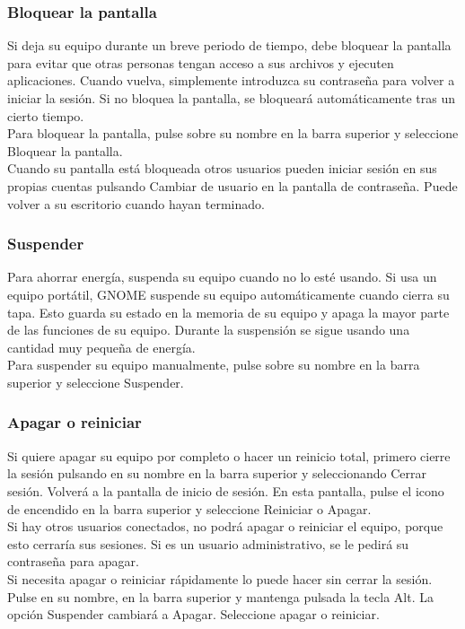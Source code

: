 \subsubsection{Bloquear la pantalla}
Si deja su equipo durante un breve periodo de tiempo, debe bloquear la pantalla para evitar que otras personas tengan acceso a sus archivos y ejecuten aplicaciones. Cuando vuelva, simplemente introduzca su contraseña para volver a iniciar la sesión. Si no bloquea la pantalla, se bloqueará automáticamente tras un cierto tiempo.\\

Para bloquear la pantalla, pulse sobre su nombre en la barra superior y seleccione Bloquear la pantalla.\\

Cuando su pantalla está bloqueada otros usuarios pueden iniciar sesión en sus propias cuentas pulsando Cambiar de usuario en la pantalla de contraseña. Puede volver a su escritorio cuando hayan terminado.
\subsubsection{Suspender}
Para ahorrar energía, suspenda su equipo cuando no lo esté usando. Si usa un equipo portátil, GNOME suspende su equipo automáticamente cuando cierra su tapa. Esto guarda su estado en la memoria de su equipo y apaga la mayor parte de las funciones de su equipo. Durante la suspensión se sigue usando una cantidad muy pequeña de energía.\\

Para suspender su equipo manualmente, pulse sobre su nombre en la barra superior y seleccione Suspender.
\subsubsection{Apagar o reiniciar}
Si quiere apagar su equipo por completo o hacer un reinicio total, primero cierre la sesión pulsando en su nombre en la barra superior y seleccionando Cerrar sesión. Volverá a la pantalla de inicio de sesión. En esta pantalla, pulse el icono de encendido en la barra superior y seleccione Reiniciar o Apagar.\\
Si hay otros usuarios conectados, no podrá apagar o reiniciar el equipo, porque esto cerraría sus sesiones. Si es un usuario administrativo, se le pedirá su contraseña para apagar.\\

Si necesita apagar o reiniciar rápidamente lo puede hacer sin cerrar la sesión. Pulse en su nombre, en la barra superior y mantenga pulsada la tecla Alt. La opción Suspender cambiará a Apagar. Seleccione apagar o reiniciar.
